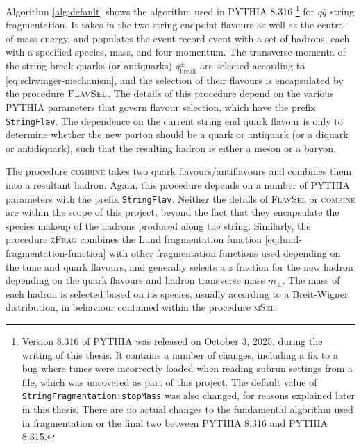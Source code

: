 \documentclass[12pt,a4paper]{report}
\begin{document}
Algorithm \ref{alg:default} shows the algorithm used in PYTHIA 8.316 \footnote{Version 8.316 of PYTHIA was released on October 3, 2025, during the writing of this thesis. It contains a number of changes, including a fix to a bug where tunes were incorrectly loaded when reading subrun settings from a file, which was uncovered as part of this project. The default value of \texttt{StringFragmentation:stopMass} was also changed, for reasons explained later in this thesis. There are no actual changes to the fundamental algorithm used in fragmentation or the final two between PYTHIA 8.316 and PYTHIA 8.315.} for $q\bar{q}$ string fragmentation. It takes in the two string endpoint flavours as well as the centre-of-mass energy, and populates the event record $\text{event}$ with a set of hadrons, each with a specified species, mass, and four-momentum. The transverse momenta of the string break quarks (or antiquarks) $q_\text{break}^\pm$ are selected according to \eqref{eq:schwinger-mechanism}, and the selection of their flavours is encapsulated by the procedure $\textsc{FlavSel}$. The details of this procedure depend on the various PYTHIA parameters that govern flavour selection, which have the prefix \texttt{StringFlav}. The dependence on the current string end quark flavour is only to determine whether the new parton should be a quark or antiquark (or a diquark or antidiquark), such that the resulting hadron is either a meson or a baryon.

The procedure \textsc{combine} takes two quark flavours/antiflavours and combines them into a resultant hadron. Again, this procedure depends on a number of PYTHIA parameters with the prefix \texttt{StringFlav}. Neither the details of \textsc{FlavSel} or \textsc{combine} are within the scope of this project, beyond the fact that they encapsulate the species makeup of the hadrons produced along the string. Similarly, the procedure \textsc{zFrag} combines the Lund fragmentation function \eqref{eq:lund-fragmentation-function} with other fragmentation functions used depending on the tune and quark flavours, and generally selects a $z$ fraction for the new hadron depending on the quark flavours and hadron transverse mass $m_\perp$. The mass of each hadron is selected based on its species, usually according to a Breit-Wigner distribution, in behaviour contained within the procedure \textsc{mSel}.
\end{document}
